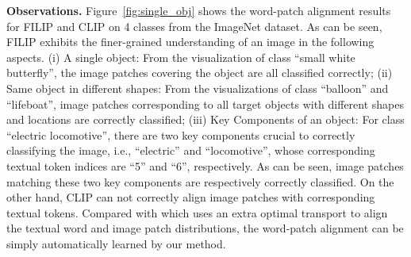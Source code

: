 \textbf{Observations.}
Figure~\ref{fig:single_obj} shows the word-patch alignment results for FILIP and CLIP on 4 classes from the ImageNet dataset.
As can be seen,
FILIP exhibits the finer-grained understanding of 
an image in the following aspects. 
(i) A single object: 
From the visualization of class ``small white butterfly'', the image patches covering the object are all classified correctly;
(ii) Same object in different shapes:
From the visualizations of class ``balloon'' and ``lifeboat'', image patches corresponding to all target objects with different shapes and locations  are correctly classified; 
(iii) Key Components of an object: For class ``electric locomotive'', there are two key components crucial to correctly classifying the image, i.e., ``electric'' and ``locomotive'', whose corresponding textual token indices are ``5'' and ``6'', respectively. As can be seen, image patches matching these two key components are respectively correctly classified.
On the other hand, CLIP can not correctly align image patches with corresponding textual tokens.
Compared with \cite{kim2021vilt} which uses an extra optimal transport to align the textual word and image patch distributions, the word-patch alignment can be simply automatically learned by our method. 



